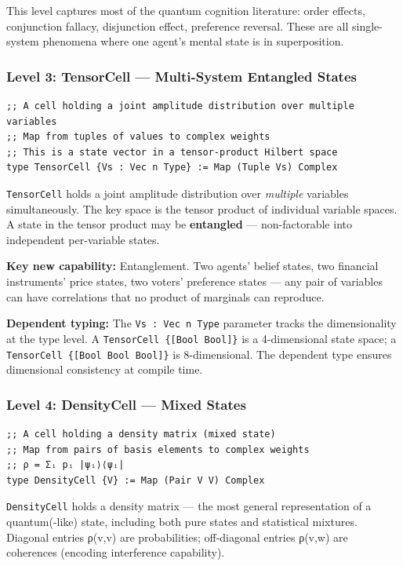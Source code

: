 \documentclass[11pt]{article}
\begin{document}
This level captures most of the quantum cognition literature: order effects,
conjunction fallacy, disjunction effect, preference reversal. These are all
single-system phenomena where one agent's mental state is in superposition.
\subsubsection{Level 3: TensorCell --- Multi-System Entangled States}
\label{sec:orgb62444c}

\begin{verbatim}
;; A cell holding a joint amplitude distribution over multiple variables
;; Map from tuples of values to complex weights
;; This is a state vector in a tensor-product Hilbert space
type TensorCell {Vs : Vec n Type} := Map (Tuple Vs) Complex
\end{verbatim}

\texttt{TensorCell} holds a joint amplitude distribution over \emph{multiple} variables
simultaneously. The key space is the tensor product of individual variable
spaces. A state in the tensor product may be \textbf{entangled} --- non-factorable
into independent per-variable states.

\textbf{Key new capability:} Entanglement. Two agents' belief states, two financial
instruments' price states, two voters' preference states --- any pair of
variables can have correlations that no product of marginals can reproduce.

\textbf{Dependent typing:} The \texttt{Vs : Vec n Type} parameter tracks the dimensionality
at the type level. A \texttt{TensorCell \{[Bool Bool]\}} is a 4-dimensional state
space; a \texttt{TensorCell \{[Bool Bool Bool]\}} is 8-dimensional. The dependent type
ensures dimensional consistency at compile time.
\subsubsection{Level 4: DensityCell --- Mixed States}
\label{sec:org51428c5}

\begin{verbatim}
;; A cell holding a density matrix (mixed state)
;; Map from pairs of basis elements to complex weights
;; ρ = Σᵢ pᵢ |ψᵢ⟩⟨ψᵢ|
type DensityCell {V} := Map (Pair V V) Complex
\end{verbatim}

\texttt{DensityCell} holds a density matrix --- the most general representation of a
quantum(-like) state, including both pure states and statistical mixtures.
Diagonal entries ρ(v,v) are probabilities; off-diagonal entries ρ(v,w) are
coherences (encoding interference capability).
\end{document}
